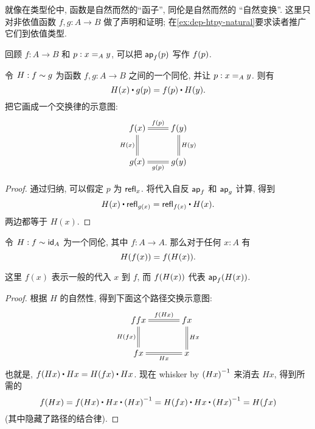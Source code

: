 %
%
就像在类型伦中, 函数是自然而然的``函子'', 同伦是自然而然的
%
``自然变换''.
这里只对非依值函数 $f,g:A\to B$ 做了声明和证明; 在\cref{ex:dep-htpy-natural}要求读者推广它们到依值类型.

回顾 $f:A\to B$ 和 $p:\id[A]xy$, 可以把 $\apfunc{f} (p)$ 写作 $\ap f p$.

\begin{lem}
    \label{lem:htpy-natural}
    令 $H:f\htpy g$ 为函数  $f,g:A\to B$ 之间的一个同伦, 并让 $p:\id[A]xy$. 则有
    \begin{equation*}
        H(x)\ct\ap{g}{p}=\ap{f}{p}\ct H(y).
    \end{equation*}
    把它画成一个交换律的示意图:
    \begin{align*}
        \xymatrix{
            f(x) \ar@{=}[r]^{\ap fp} \ar@{=}[d]_{H(x)} & f(y) \ar@{=}[d]^{H(y)} \\
            g(x) \ar@{=}[r]_{\ap gp} & g(y)
        }
    \end{align*}
\end{lem}
\begin{proof}
    通过归纳, 可以假定 $p$ 为 $\refl x$.
    将代入自反 $\apfunc{f}$ 和 $\apfunc g$ 计算, 得到
    \[ H(x) \ct \refl{g(x)} = \refl{f(x)} \ct H(x). \]
    两边都等于 $H(x)$.
\end{proof}

\begin{cor}\label{cor:hom-fg}
  令 $H : f \htpy \idfunc[A]$ 为一个同伦, 其中 $f : A \to A$. 那么对于任何 $x : A$ 有 \[ H(f(x)) = \ap f{H(x)}. \]
\end{cor}
\noindent
这里 $f(x)$ 表示一般的代入 $x$ 到 $f$, 而 $\ap f{H(x)}$ 代表 $\apfunc{f}(H(x))$.
\begin{proof}
    根据 $H$ 的自然性, 得到下面这个路径交换示意图:
    \begin{align*}
        \xymatrix@C=3pc{
            ffx \ar@{=}[r]^-{\ap f{Hx}} \ar@{=}[d]_{H(fx)} & fx \ar@{=}[d]^{Hx} \\
            fx \ar@{=}[r]_-{Hx} & x
        }
    \end{align*}
    也就是, $\ap f{H x} \ct H x = H(f x) \ct H x$.
    现在 whisker by $\opp{(H x)}$ 来消去 $H x$, 得到所需的
    \[ \ap f{H x}
    = \ap f{H x} \ct H x \ct \opp{(H x)}
    = H(f x) \ct H x \ct \opp{(H x)}
    = H(f x)
    \]
    (其中隐藏了路径的结合律).
\end{proof}

